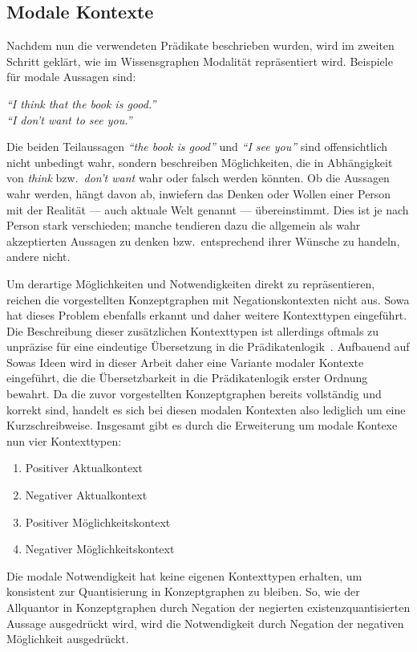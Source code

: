 \subsection{Modale Kontexte}%
\label{sec:text2kg:ontology:modal}

Nachdem nun die verwendeten Prädikate beschrieben wurden, wird im zweiten Schritt geklärt, wie im Wissensgraphen Modalität repräsentiert wird.
Beispiele für modale Aussagen sind:
\begin{center}
	\textit{``I {\color{blau}think} that {\color{rot}the book is good}.''}\\
	\textit{``{\color{rot}I} {\color{blau}don't want} to {\color{rot}see you}.''}
\end{center}
Die beiden Teilaussagen \textit{\color{rot}``the book is good''} und \textit{\color{rot}``I see you''} sind offensichtlich nicht unbedingt wahr, sondern beschreiben Möglichkeiten, die in Abhängigkeit von \textit{\color{blau}think} bzw.\ \textit{\color{blau}don't want} wahr oder falsch werden könnten.
Ob die Aussagen wahr werden, hängt davon ab, inwiefern das Denken oder Wollen einer Person mit der Realität --- auch aktuale Welt genannt --- übereinstimmt.
Dies ist je nach Person stark verschieden; manche tendieren dazu die allgemein als wahr akzeptierten Aussagen zu denken bzw.\ entsprechend ihrer Wünsche zu handeln, andere nicht.

Um derartige Möglichkeiten und Notwendigkeiten direkt zu repräsentieren, reichen die vorgestellten Konzeptgraphen mit Negationskontexten nicht aus.
Sowa hat dieses Problem ebenfalls erkannt und daher weitere Kontexttypen eingeführt.
Die Beschreibung dieser zusätzlichen Kontexttypen ist allerdings oftmals zu unpräzise für eine eindeutige Übersetzung in die Prädikatenlogik~\cite{Wermelinger1995}.
Aufbauend auf Sowas Ideen wird in dieser Arbeit daher eine Variante modaler Kontexte eingeführt, die die Übersetzbarkeit in die Prädikatenlogik erster Ordnung bewahrt.
Da die zuvor vorgestellten Konzeptgraphen bereits vollständig und korrekt sind, handelt es sich bei diesen modalen Kontexten also lediglich um eine Kurzschreibweise.
Insgesamt gibt es durch die Erweiterung um modale Kontexe nun vier Kontexttypen:
\begin{multicols}{2}
	\flushleft\begin{enumerate}
		\item Positiver Aktualkontext
		\item Negativer Aktualkontext
		\item Positiver Möglichkeitskontext
		\item Negativer Möglichkeitskontext
	\end{enumerate}
\end{multicols}
Die modale Notwendigkeit hat keine eigenen Kontexttypen erhalten, um konsistent zur Quantisierung in Konzeptgraphen zu bleiben.
So, wie der Allquantor in Konzeptgraphen durch Negation der negierten existenzquantisierten Aussage ausgedrückt wird, wird die Notwendigkeit durch Negation der negativen Möglichkeit ausgedrückt.

